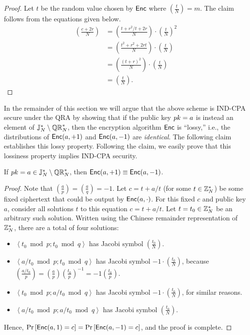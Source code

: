 \documentclass[11pt]{article}
\begin{document}
\begin{proof}
  Let $t$ be the random value chosen by $\mathsf{Enc}$ where $\left(
    \frac{t}{N} \right) = m$.  The claim follows from the equations
  given below.
  \begin{align*}
    \left( \frac{c+2r}{N} \right) &= \left( \frac{t + r^2/t + 2r}{N}
    \right) \cdot \left( \frac{t}{N} \right)^2  \\
    &= \left( \frac{t^2 + r^2 + 2rt}{N} \right) \cdot \left(
      \frac{t}{N} \right)  \\
    &= \left( \frac{(t+r)^2}{N} \right) \cdot \left( \frac{t}{N}
    \right) \\
    &= \left( \frac{t}{N} \right).
  \end{align*}
\end{proof}

In the remainder of this section we will argue that the above scheme
is IND-CPA secure under the QRA by showing that if the public key $pk
= a$ is instead an element of $\mathbb{J}_N^{*} \setminus \mathbb{QR}_{N}^{*}$, then the
encryption algorithm $\mathsf{Enc}$ is ``lossy,'' i.e., the distributions
of $\mathsf{Enc}(a, +1)$ and $\mathsf{Enc}(a, -1)$ are \emph{identical}.  The
following claim establishes this lossy property.  Following the claim,
we easily prove that this lossiness property implies IND-CPA security.

\begin{claim}
  \label{claim:lossy}
  If $pk = a \in \mathbb{J}_N^{*} \setminus \mathbb{QR}_{N}^{*}$, then $\mathsf{Enc}(a, +1)
  \equiv \mathsf{Enc}(a, -1)$.
\end{claim}

\begin{proof}
  Note that $\left( \frac{a}{p} \right) = \left( \frac{a}{q} \right) =
  -1$.  Let $c = t+a/t$ (for some $t \in \mathbb{Z}_N^{*}$) be some fixed
  ciphertext that could be output by $\mathsf{Enc}(a, \cdot)$.  For this
  fixed $c$ and public key $a$, consider all solutions $t$ to this
  equation $c = t+a/t$.  Let $t = t_0 \in \mathbb{Z}_N^*$ be an arbitrary such
  solution.  Written using the Chinese remainder representation of
  $\mathbb{Z}_N^{*}$, there are a total of four solutions:
  \begin{itemize}
  \item $\left\langle t_0 \bmod p ; t_0 \bmod q \right\rangle$ has
    Jacobi symbol $\left( \frac{t_0}{N} \right)$.
  \item $\left\langle a/t_0 \bmod p ; t_0 \bmod q \right\rangle$ has
    Jacobi symbol $-1 \cdot \left( \frac{t_0}{N} \right)$, because
    $\left( \frac{a/t_{0}}{p} \right) = \left( \frac{a}{p} \right)
    \left( \frac{t_{0}}{p} \right)^{-1} = -1 \left( \frac{t_{0}}{p}
    \right)$.
  \item $\left\langle t_0 \bmod p ; a/t_0 \bmod q \right\rangle$ has
    Jacobi symbol $-1 \cdot \left( \frac{t_0}{N} \right)$, for similar
    reasons.
  \item $\left\langle a/t_0 \bmod p ; a/t_0 \bmod q \right\rangle$ has
    Jacobi symbol $\left( \frac{t_0}{N} \right)$.
  \end{itemize}
  Hence, $\Pr \left[ \mathsf{Enc}(a, 1) = c \right] = \Pr \left[ \mathsf{Enc}(a,
    -1) = c \right]$, and the proof is complete.
\end{proof}
\end{document}

